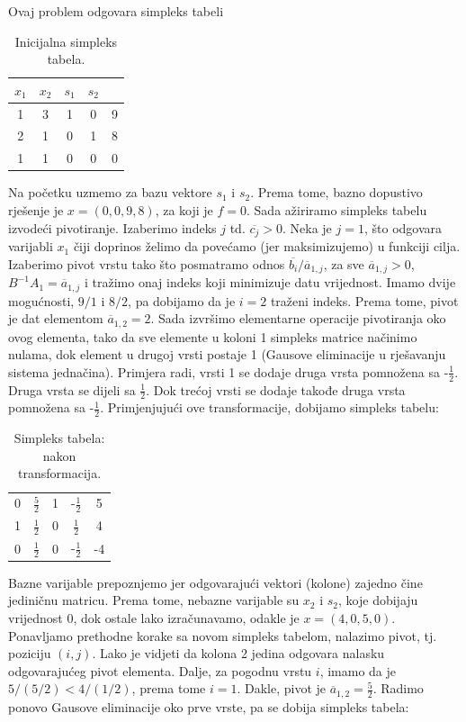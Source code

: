 \documentclass[a4paper, utf8, 11pt, colorlinks]{book}
\begin{document}
 Ovaj problem odgovara simpleks tabeli \\
 \begin{table}[H]
     \centering
     \begin{tabular}{c c c c | c}
     	 $x_1$ & $x_2$ &  $s_1$ & $s_2$ & \\ \hline
         1 &  3  & 1 & 0 & 9 \\
         2 &  1  & 0 & 1 & 8 \\ \hline
         1 &  1  & 0  & 0 & 0 \\ \hline
     \end{tabular}
     \caption{Inicijalna simpleks tabela.}
     \label{tab:simpleks_tabela1}
 \end{table} 
 Na početku uzmemo za bazu vektore $s_1$ i $s_2$. Prema tome, bazno dopustivo rješenje je $x = (0, 0, 9, 8)$, za koji je $f =0$. Sada ažiriramo simpleks tabelu izvodeći pivotiranje. Izaberimo indeks $j$ td. $\overline{c_j}>0$. Neka je $j=1$, što odgovara varijabli $x_1$ čiji doprinos želimo da povećamo (jer maksimizujemo) u funkciji cilja. Izaberimo pivot vrstu tako što posmatramo odnos $\overline{b_i}/\overline{a}_{1,j}$, za sve $\overline{a}_{1,j} > 0$,  $B^{-1} A_1 = \overline{a}_{1,j}$
 i tražimo onaj indeks koji minimizuje datu vrijednost. Imamo dvije mogućnosti, $9/1$ i $8/2$, pa dobijamo da je $i = 2$ traženi indeks. Prema tome, pivot je dat elementom $\overline{a}_{1,2}=2$. Sada izvršimo elementarne operacije pivotiranja oko ovog elementa,  tako da sve elemente u koloni 1 simpleks matrice načinimo nulama, dok element u drugoj vrsti postaje 1 (Gausove eliminacije u rješavanju sistema jednačina). Primjera radi, vrsti 1 se dodaje druga vrsta pomnožena sa -$\frac{1}{2}$. Druga vrsta se dijeli sa $\frac{1}{2}$. Dok trećoj vrsti se dodaje takođe druga vrsta pomnožena sa -$\frac{1}{2}$. 
 Primjenjujući ove transformacije, dobijamo simpleks tabelu:
 
  \begin{table}[!ht]
     \centering
     \begin{tabular}{c c c c | c}
         0 &  $\frac{5}{2}$  & 1 & -$\frac{1}{2} $& 5 \\
         1 &  $\frac{1}{2}$ & 0 & $\frac{1}{2}$ & 4 \\ \hline
         0 &  $\frac{1}{2}$ & 0 & -$\frac{1}{2}$ & -4 \\ \hline
     \end{tabular}
     \caption{Simpleks tabela: nakon transformacija.}
     \label{tab:simpleks_tabela2}
 \end{table}
Bazne varijable prepoznjemo jer odgovarajući vektori (kolone) zajedno čine jediničnu matricu. Prema tome, 
 nebazne varijable su $x_2$ i $s_2$, koje dobijaju vrijednost 0, dok ostale lako izračunavamo, odakle je $ x = (4, 0, 5, 0)$. Ponavljamo prethodne korake sa novom simpleks tabelom, nalazimo pivot, tj. poziciju  $(i,j)$. Lako je vidjeti da kolona 2 jedina odgovara nalasku odgovarajućeg pivot elementa. Dalje, za pogodnu vrstu $i$, imamo da je $5 / (5/2) < 4 / (1/2)$, prema tome $i =1$. Dakle, pivot je 
 $\overline{a}_{1,2} = \frac{5}{2}$. Radimo ponovo Gausove eliminacije oko prve vrste, pa se dobija simpleks tabela:
 
\end{document}
